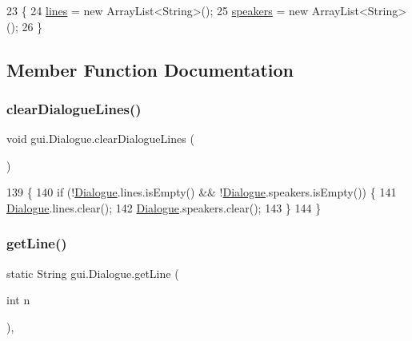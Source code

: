 \begin{DoxyCode}
23                        \{
24         \mbox{\hyperlink{classgui_1_1_dialogue_a83efa9d7d08512fd59390c8ecaade1f7}{lines}} = \textcolor{keyword}{new} ArrayList<String>();
25         \mbox{\hyperlink{classgui_1_1_dialogue_a0c75cc6f6e28bb1c6807d78a11adf807}{speakers}} = \textcolor{keyword}{new} ArrayList<String>();
26     \}
\end{DoxyCode}


\subsection{Member Function Documentation}
\mbox{\label{classgui_1_1_dialogue_aaa643e4f8b14c6734f4d39d01049e850}} 
\subsubsection{\texorpdfstring{clear\+Dialogue\+Lines()}{clearDialogueLines()}}
{\footnotesize\ttfamily void gui.\+Dialogue.\+clear\+Dialogue\+Lines (\begin{DoxyParamCaption}{ }\end{DoxyParamCaption})\hspace{0.3cm}{\ttfamily [inline]}}


\begin{DoxyCode}
139                                      \{
140         \textcolor{keywordflow}{if} (!\mbox{\hyperlink{classgui_1_1_dialogue_afcba0958e7749ae95706d5f1d81800cd}{Dialogue}}.lines.isEmpty() && !\mbox{\hyperlink{classgui_1_1_dialogue_afcba0958e7749ae95706d5f1d81800cd}{Dialogue}}.speakers.isEmpty()) \{
141             \mbox{\hyperlink{classgui_1_1_dialogue_afcba0958e7749ae95706d5f1d81800cd}{Dialogue}}.lines.clear();
142             \mbox{\hyperlink{classgui_1_1_dialogue_afcba0958e7749ae95706d5f1d81800cd}{Dialogue}}.speakers.clear();
143         \}
144     \}
\end{DoxyCode}
\mbox{\label{classgui_1_1_dialogue_acfaf19a365093cef7abd63b2bb4e6f4f}} 
\subsubsection{\texorpdfstring{get\+Line()}{getLine()}}
{\footnotesize\ttfamily static String gui.\+Dialogue.\+get\+Line (\begin{DoxyParamCaption}\item[{int}]{n }\end{DoxyParamCaption})\hspace{0.3cm}{\ttfamily [inline]}, {\ttfamily [static]}}


